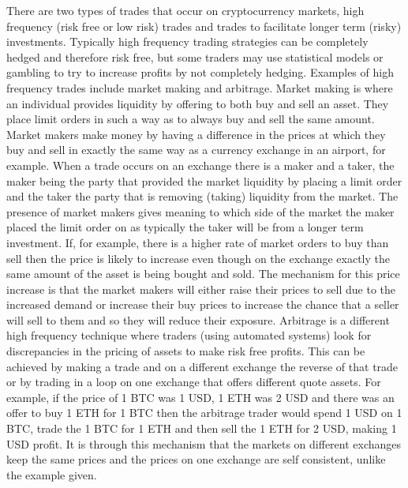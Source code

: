 \documentclass[a4paper,10pt]{article}
\begin{document}
There are two types of trades that occur on cryptocurrency markets, high frequency (risk free or low risk) trades and trades to facilitate longer term (risky) investments. Typically high frequency trading strategies can be completely hedged and therefore risk free, but some traders may use statistical models or gambling to try to increase profits by not completely hedging. Examples of high frequency trades include market making and arbitrage. Market making is where an individual provides liquidity by offering to both buy and sell an asset. They place limit orders in such a way as to always buy and sell the same amount. Market makers make money by having a difference in the prices at which they buy and sell in exactly the same way as a currency exchange in an airport, for example. When a trade occurs on an exchange there is a maker and a taker, the maker being the party that provided the market liquidity by placing a limit order and the taker the party that is removing (taking) liquidity from the market. The presence of market makers gives meaning to which side of the market the maker placed the limit order on as typically the taker will be from a longer term investment. If, for example, there is a higher rate of market orders to buy than sell then the price is likely to increase even though on the exchange exactly the same amount of the asset is being bought and sold. The mechanism for this price increase is that the market makers will either raise their prices to sell due to the increased demand or increase their buy prices to increase the chance that a seller will sell to them and so they will reduce their exposure. Arbitrage is a different high frequency technique where traders (using automated systems) look for discrepancies in the pricing of assets to make risk free profits. This can be achieved by making a trade and on a different exchange the reverse of that trade or by trading in a loop on one exchange that offers different quote assets. For example, if the price of 1 BTC was 1 USD, 1 ETH was 2 USD and there was an offer to buy 1 ETH for 1 BTC then the arbitrage trader would spend 1 USD on 1 BTC, trade the 1 BTC for 1 ETH and then sell the 1 ETH for 2 USD, making 1 USD profit. It is through this mechanism that the markets on different exchanges keep the same prices and the prices on one exchange are self consistent, unlike the example given. \\ \\
\end{document}
